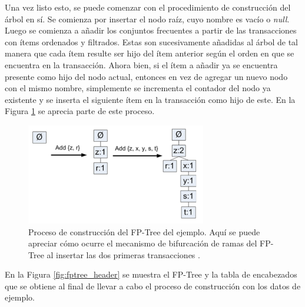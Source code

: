 Una vez listo esto, se puede comenzar con el procedimiento de construcción del árbol en sí. Se comienza por insertar el nodo raíz, cuyo nombre es vacío o \textit{null}. Luego se comienza a añadir los conjuntos frecuentes a partir de las transacciones con ítems ordenados y filtrados. Estas son sucesivamente añadidas al árbol de tal manera que cada ítem resulte ser hijo del ítem anterior según el orden en que se encuentra en la transacción. Ahora bien, si el ítem a añadir ya se encuentra presente como hijo del nodo actual, entonces en vez de agregar un nuevo nodo con el mismo nombre, simplemente se incrementa el contador del nodo ya existente y se inserta el siguiente ítem en la transacción como hijo de este. En la Figura \ref{fig:fptree_process} se aprecia parte de este proceso.

\begin{figure}[h!]
\begin{center}
\includegraphics[width=0.7\textwidth]{imagenes/fptree_process.png}
\end{center}
\vspace*{-5mm}
\caption{Proceso de construcción del FP-Tree del ejemplo. Aquí se puede apreciar cómo ocurre el mecanismo de bifurcación de ramas del FP-Tree al insertar las dos primeras transacciones \cite{harrington2012machine}.}
\label{fig:fptree_process}
\end{figure}

En la Figura \ref{fig:fptree_header} se muestra el FP-Tree y la tabla de encabezados que se obtiene al final de llevar a cabo el proceso de construcción con los datos de ejemplo.

